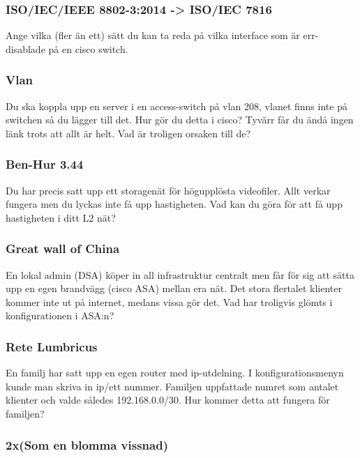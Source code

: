 \subsubsection{ISO/IEC/IEEE 8802-3:2014 -\textgreater{} ISO/IEC
7816}\label{isoiecieee-8802-32014---isoiec-7816}

Ange vilka (fler än ett) sätt du kan ta reda på vilka interface som är
err-disablade på en cisco switch.

\subsubsection{Vlan}\label{vlan}

Du ska koppla upp en server i en access-switch på vlan 208, vlanet finns
inte på switchen så du lägger till det. Hur gör du detta i cisco? Tyvärr
får du ändå ingen länk trots att allt är helt. Vad är troligen orsaken
till de?

\subsubsection{Ben-Hur 3.44}\label{ben-hur-3.44}

Du har precis satt upp ett storagenät för högupplösta videofiler. Allt
verkar fungera men du lyckas inte få upp hastigheten. Vad kan du göra
för att få upp hastigheten i ditt L2 nät?

\subsubsection{Great wall of China}\label{great-wall-of-china}

En lokal admin (DSA) köper in all infrastruktur centralt men får för sig
att sätta upp en egen brandvägg (cisco ASA) mellan era nät. Det stora
flertalet klienter kommer inte ut på internet, medans vissa gör det. Vad
har troligvis glömts i konfigurationen i ASA:n?

\subsubsection{Rete Lumbricus}\label{rete-lumbricus}

En familj har satt upp en egen router med ip-utdelning. I
konfigurationsmenyn kunde man skriva in ip/ett nummer. Familjen
uppfattade numret som antalet klienter och valde således 192.168.0.0/30.
Hur kommer detta att fungera för familjen?

\subsubsection{2x(Som en blomma vissnad)}\label{xsom-en-blomma-vissnad}

